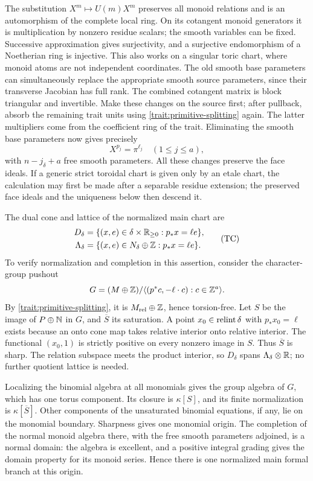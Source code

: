 The substitution \(X^m\mapsto U(m)X^m\) preserves all monoid
relations and is an automorphism of the complete local ring.  On
its cotangent monoid generators it is multiplication by nonzero
residue scalars; the smooth variables can be fixed.  Successive
approximation gives surjectivity, and a surjective endomorphism of
a Noetherian ring is injective.  This also works on a singular
toric chart, where monoid atoms are not independent coordinates.
The old smooth base parameters can simultaneously replace the
appropriate smooth source parameters, since their transverse
Jacobian has full rank.  The combined cotangent matrix is block
triangular and invertible.  Make these changes on the source
first; after pullback, absorb the remaining trait units using
\eqref{trait:primitive-splitting} again.  The latter multipliers
come from the coefficient ring of the trait.  Eliminating the
smooth base parameters now gives precisely
\[
 X^{p_j}=\pi^{\ell_j}\quad(1\le j\le a),
\]
with \(n-j_\delta+a\) free smooth parameters.  All these changes
preserve the face ideals.  If a generic strict toroidal chart is
given only by an etale chart, the calculation may first be made
after a separable residue extension; the preserved face ideals
and the uniqueness below then descend it.

The dual cone and lattice of the normalized main chart are
\begin{equation}
 \begin{split}
 D_\delta&=\{(x,e)\in\delta\times\mathbb R_{\ge0}:p_*x=\ell e\},\\
 \Lambda_\delta&=\{(x,e)\in N_\delta\oplus\mathbb Z:p_*x=\ell e\}.
 \end{split}
 \tag{TC}\label{trait:TC}
\end{equation}
To verify normalization and completion in this assertion, consider
the character-group pushout
\[
 G=(M\oplus\mathbb Z)/
 \langle(p^*c,-\ell\cdot c):c\in\mathbb Z^a\rangle.
\]
By \eqref{trait:primitive-splitting}, it is
\(M_{\mathrm{rel}}\oplus\mathbb Z\), hence torsion-free.  Let \(S\) be
the image of \(P\oplus\mathbb N\) in \(G\), and \(\overline S\) its
saturation.  A point \(x_0\in\operatorname{relint}\delta\) with
\(p_*x_0=\ell\) exists because an onto cone map takes relative
interior onto relative interior.  The functional \((x_0,1)\) is
strictly positive on every nonzero image in \(S\).  Thus
\(\overline S\) is sharp.  The relation subspace meets the product
interior, so \(D_\delta\) spans
\(\Lambda_\delta\otimes\mathbb R\); no further quotient lattice is needed.

Localizing the binomial algebra at all monomials gives the group
algebra of \(G\), which has one torus component.  Its closure is
\(\kappa[S]\), and its finite normalization is
\(\kappa[\overline S]\).  Other components of the unsaturated
binomial equations, if any, lie on the monomial boundary.  Sharpness
gives one monomial origin.  The completion of the normal monoid
algebra there, with the free smooth parameters adjoined, is a
normal domain: the algebra is excellent, and a positive integral
grading gives the domain property for its monoid series.  Hence
there is one normalized main formal branch at this origin.

